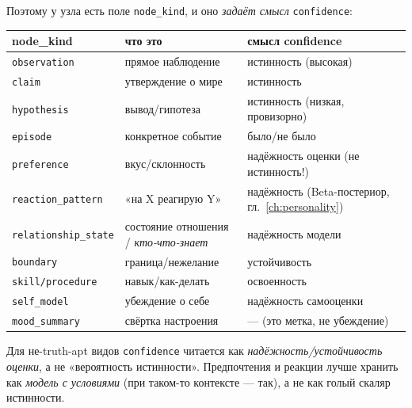 Поэтому у узла есть поле \texttt{node\_kind}, и оно \emph{задаёт смысл}
\texttt{confidence}:

\begin{longtable}{p{} p{} p{}}
\toprule
\textbf{node\_kind} & \textbf{что это} & \textbf{смысл confidence} \\
\midrule
\endhead
\texttt{observation} & прямое наблюдение & истинность (высокая) \\
\texttt{claim} & утверждение о мире & истинность \\
\texttt{hypothesis} & вывод/гипотеза & истинность (низкая, провизорно) \\
\texttt{episode} & конкретное событие & было/не было \\
\texttt{preference} & вкус/склонность & надёжность оценки (не истинность!) \\
\texttt{reaction\_pattern} & «на X реагирую Y» & надёжность (Beta-постериор, гл.~\ref{ch:personality}) \\
\texttt{relationship\_state} & состояние отношения / \emph{кто-что-знает} & надёжность модели \\
\texttt{boundary} & граница/нежелание & устойчивость \\
\texttt{skill/procedure} & навык/как-делать & освоенность \\
\texttt{self\_model} & убеждение о себе & надёжность самооценки \\
\texttt{mood\_summary} & свёртка настроения & — (это метка, не убеждение) \\
\bottomrule
\end{longtable}

Для не-truth-apt видов \texttt{confidence} читается как \emph{надёжность/устойчивость
оценки}, а не «вероятность истинности». Предпочтения и реакции лучше хранить как
\emph{модель с условиями} (при таком-то контексте — так), а не как голый скаляр
истинности.

